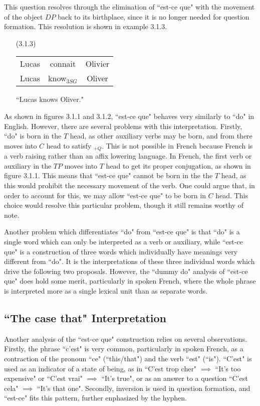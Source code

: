 \documentclass{article}
\begin{document}
This question resolves through the elimination of ``est-ce que" with the movement of the object $DP$ back to its birthplace, since it is no longer needed for question formation. This resolution is shown in example 3.1.3.

\begin{enumerate}
    \item[(3.1.3)] \begin{tabular}{ ccc }
        Lucas & connait & Olivier \\
        Lucas & know$_{3SG}$ & Oliver
    \end{tabular}

    ``Lucas knows Oliver."
\end{enumerate}



As shown in figures 3.1.1 and 3.1.2, ``est-ce que" behaves very similarly to ``do" in English. However, there are several problems with this interpretation. Firstly, ``do" is born in the $T$ head, as other auxiliary verbs may be born, and from there moves into $C$ head to satisfy $_{+Q}$. This is not possible in French because French is a verb raising rather than an affix lowering language. In French, the first verb or auxiliary in the $TP$ moves into $T$ head to get its proper conjugation, as shown in figure 3.1.1. This means that ``est-ce que" cannot be born in the the $T$ head, as this would prohibit the necessary movement of the verb. One could argue that, in order to account for this, we may allow ``est-ce que" to be born in $C$ head. This choice would resolve this particular problem, though it still remains worthy of note.

Another problem which differentiates ``do" from ``est-ce que" is that ``do" is a single word which can only be interpreted as a verb or auxiliary, while ``est-ce que" is a construction of three words which individually have meanings very different from ``do". It is the interpretations of these three individual words which drive the following two proposals. However, the ``dummy do" analysis of ``est-ce que" does hold some merit, particularly in spoken French, where the whole phrase is interpreted more as a single lexical unit than as separate words.

\subsection{``The case that" Interpretation}

Another analysis of the ``est-ce que" construction relies on several observations. Firstly, the phrase ``c'est" is very common, particularly in spoken French, as a contraction of the pronoun ``ce" (``this/that") and the verb ``est" (``is"). ``C'est" is used as an indicator of a state of being, as in ``C'est trop cher" $\implies$ ``It's too expensive" or ``C'est vrai" $\implies$ ``It's true", or as an answer to a question ``C'est cela" $\implies$ ``It's that one". Secondly, inversion is used in question formation, and ``est-ce" fits this pattern, further enphasized by the hyphen. 
\end{document}

